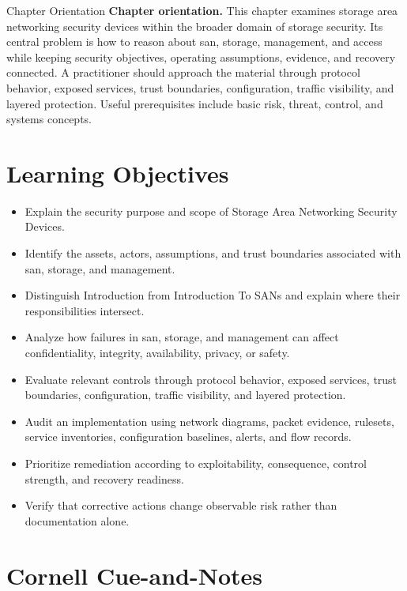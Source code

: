 \documentclass[11pt,letterpaper]{article}
\title{\CornellDocumentTitle}
\author{}
\date{}
\begin{document}
\maketitle
\begin{CornellOverviewBox}{Chapter Orientation}
\textbf{Chapter orientation.} This chapter examines storage area networking security devices within the broader domain of storage security. Its central problem is how to reason about san, storage, management, and access while keeping security objectives, operating assumptions, evidence, and recovery connected. A practitioner should approach the material through protocol behavior, exposed services, trust boundaries, configuration, traffic visibility, and layered protection. Useful prerequisites include basic risk, threat, control, and systems concepts.
\end{CornellOverviewBox}
\section*{Learning Objectives}
\begin{itemize}
\item Explain the security purpose and scope of Storage Area Networking Security Devices.
\item Identify the assets, actors, assumptions, and trust boundaries associated with san, storage, and management.
\item Distinguish Introduction from Introduction To SANs and explain where their responsibilities intersect.
\item Analyze how failures in san, storage, and management can affect confidentiality, integrity, availability, privacy, or safety.
\item Evaluate relevant controls through protocol behavior, exposed services, trust boundaries, configuration, traffic visibility, and layered protection.
\item Audit an implementation using network diagrams, packet evidence, rulesets, service inventories, configuration baselines, alerts, and flow records.
\item Prioritize remediation according to exploitability, consequence, control strength, and recovery readiness.
\item Verify that corrective actions change observable risk rather than documentation alone.
\end{itemize}
\section*{Cornell Cue-and-Notes}
\end{document}
